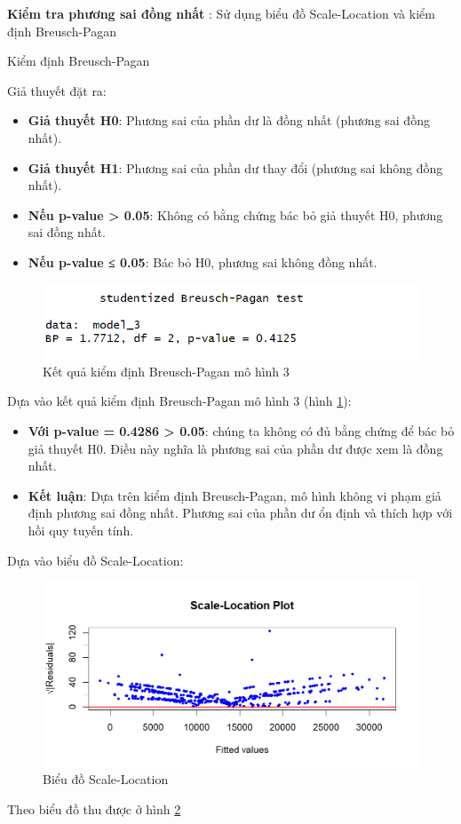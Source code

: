 \textbf{Kiểm tra phương sai đồng nhất }: Sử dụng biểu đồ Scale-Location và kiểm định Breusch-Pagan

Kiểm định Breusch-Pagan

Giả thuyết đặt ra:
\begin{itemize}
  \item\textbf{Giả thuyết H0}: Phương sai của phần dư là đồng nhất (phương sai đồng nhất).
  \item\textbf{Giả thuyết H1}: Phương sai của phần dư thay đổi (phương sai không đồng nhất).
  \item\textbf{Nếu p-value > 0.05}: Không có bằng chứng bác bỏ giả thuyết H0, phương sai đồng nhất.
  \item\textbf{Nếu p-value ≤ 0.05}: Bác bỏ H0, phương sai không đồng nhất.
\end{itemize}

\begin{figure}[H]
  \centering
  \includegraphics[width=0.7\linewidth]{graphics/5.5.10.png}
  \caption{Kết quả kiểm định Breusch-Pagan mô hình 3 }
  \label{kd3}
\end{figure}

Dựa vào kết quả kiểm định Breusch-Pagan mô hình 3 (hình \ref{kd3}):
\begin{itemize}
\item\textbf{Với p-value = 0.4286 > 0.05}: chúng ta không có đủ bằng chứng để bác bỏ giả thuyết H0. Điều này nghĩa là phương sai của phần dư được xem là đồng nhất.
\item\textbf{Kết luận}: Dựa trên kiểm định Breusch-Pagan, mô hình không vi phạm giả định phương sai đồng nhất. Phương sai của phần dư ổn định và thích hợp với hồi quy tuyến tính.
\end{itemize}

Dựa vào biểu đồ Scale-Location:

\begin{figure}[H]
  \centering
  \includegraphics[width=0.7\linewidth]{graphics/5.5.11.png}
  \caption{Biểu đồ Scale-Location }
  \label{kd4}
\end{figure}
Theo biểu đồ thu được ở hình \ref{kd4}

